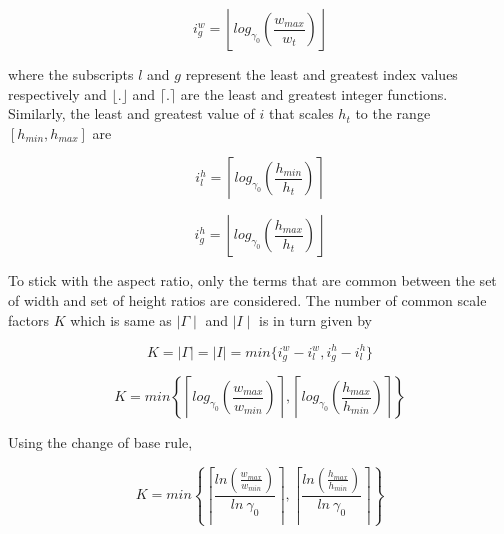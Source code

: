 \begin{equation}
i^w_g = \left \lfloor log_{\gamma_0} \left ( \frac{w_{max}}{w_t} \right ) \right \rfloor
\label{eq4}
\end{equation}

where the subscripts $l$ and $g$ represent the least and greatest index values respectively and $\lfloor.\rfloor$ and $\lceil.\rceil$ are the least and greatest integer functions. \\

\noindent
Similarly, the least and greatest value of $i$ that scales $h_t$ to the range $[h_{min}, h_{max}]$ are 

\begin{equation}
i^h_l = \left \lceil log_{\gamma_0} \left ( \frac{h_{min}}{h_t} \right ) \right \rceil
\label{eq5}
\end{equation}

\begin{equation}
i^h_g = \left \lfloor log_{\gamma_0} \left ( \frac{h_{max}}{h_t} \right ) \right \rfloor
\label{eq6}
\end{equation}


\noindent
To stick with the aspect ratio, only the terms that are common between the set of width and set of height ratios are considered. The number of common scale factors $K$ which is same as  $\mid \Gamma \mid$ and $\mid I \mid$ is in turn given by

\begin{equation}
K = \mid \Gamma \mid = \mid I \mid = min \{ i_g^w - i_l^w, i_g^h - i_l^h \}
\label{eq7}
\end{equation}

\begin{equation}
K = min \left \{ \left \lceil log_{\gamma_0} \left ( \frac{w_{max}}{w_{min}} \right ) \right \rceil , \left \lceil log_{\gamma_0} \left ( \frac{h_{max}}{h_{min}} \right ) \right \rceil \right \}
\label{eq8}
\end{equation}

Using the change of base rule,

\begin{equation}
K = min \left \{ \left \lceil \frac{ln \left ( \frac{w_{max}}{w_{min}} \right )}{ln\  \gamma_0}  \right \rceil , \left \lceil \frac{ln \left ( \frac{h_{max}}{h_{min}} \right )}{ln \ \gamma_0}  \right \rceil \right \}
\label{eq9}
\end{equation}


